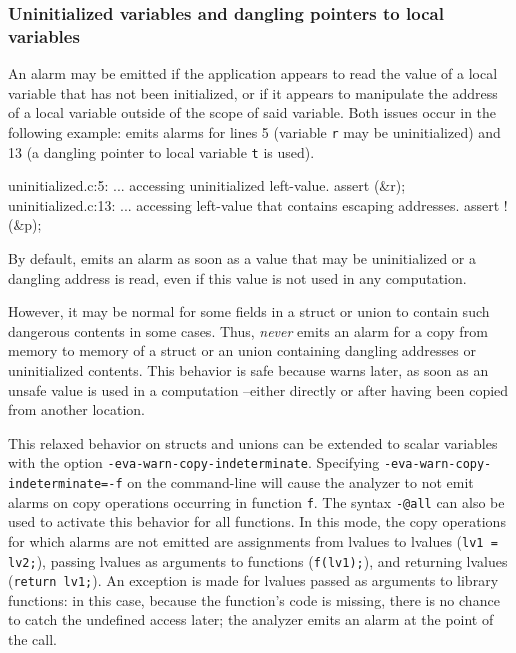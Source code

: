 \documentclass{frama-c-book}
\begin{document}
\subsubsection{Uninitialized variables and dangling pointers to local variables}
An alarm may be emitted if the application appears to read the
value of a local variable that has not been initialized, or
if it appears to manipulate the address of a local variable outside
of the scope of said variable. Both issues occur in the following
example:
\Eva{} emits alarms for lines 5
(variable \lstinline|r| may be uninitialized)
and 13 (a dangling pointer to local variable \lstinline|t| is used).
\begin{logs}
uninitialized.c:5: ...
  accessing uninitialized left-value. assert \initialized(&r);
uninitialized.c:13: ...
  accessing left-value that contains escaping addresses.
  assert !\dangling(&p);
\end{logs}

By default, \Eva{} emits an alarm as soon as a value that may be uninitialized
or a dangling address is read, even if this value is not used in any computation.

However, it may be normal for some fields in a struct or union to contain
such dangerous contents in some cases.
Thus, \Eva{} \emph{never} emits an alarm for a copy from memory to memory
of a struct or an union containing dangling addresses or uninitialized contents.
This behavior is safe because \Eva{} warns later, as soon as an unsafe value is
used in a computation --either directly or after having been copied from another
location.

This relaxed behavior on structs and unions can be extended to scalar variables
with the option \lstinline|-eva-warn-copy-indeterminate|.
Specifying \lstinline|-eva-warn-copy-indeterminate=-f| on the command-line
will cause the analyzer to not emit alarms on copy operations occurring in
function \lstinline|f|. The syntax \lstinline|-@all| can also be used to
activate this behavior for all functions.
In this mode, the copy operations for which alarms are not emitted are
assignments from lvalues to lvalues (\lstinline|lv1 = lv2;|), passing lvalues
as arguments to functions (\lstinline|f(lv1);|), and returning
lvalues (\lstinline|return lv1;|). An exception is made
for lvalues passed as arguments to library functions: in this case,
because the function's code is missing, there is no chance to catch
the undefined access later; the analyzer emits an alarm at the point
of the call.
\end{document}
